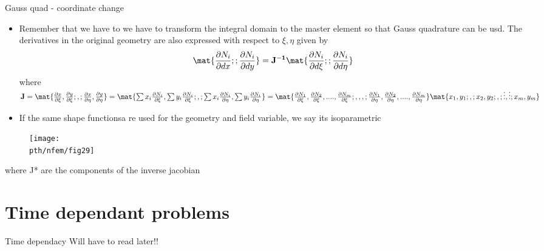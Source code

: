 	
	\begin{frame}{Gauss quad - coordinate change}
		\begin{itemize}
			\item Remember that we have to we have to transform the integral domain to the master element so that Gauss quadrature can be usd. The derivatives in the original geometry are also expressed with respect to $\xi,\eta$ given by
			\begin{equation}
			\mat{\frac{\partial N_i}{\partial dx}; ;\frac{\partial N_i}{\partial dy} } = \ve{J^{-1}} \mat{\frac{\partial N_i}{\partial d\xi}; ;\frac{\partial N_i}{\partial d\eta} } 
			\end{equation}
			where $\ve{J} = \mat{\frac{\partial x}{\partial \xi}, \frac{\partial y}{\partial \xi}; , ; \frac{\partial x}{\partial \eta}, \frac{\partial y}{\partial \eta}} =
			\mat {\sum x_i \frac{\partial N_i}{\partial \xi}, \sum y_i \frac{\partial N_i}{\partial \xi} ; , ; 
			\sum x_i \frac{\partial N_i}{\partial \eta}, \sum y_i \frac{\partial N_i}{\partial \eta}} = \mat{\frac{\partial N_1}{\partial \xi}, \frac{\partial N_2}{\partial \xi}, .... ,\frac{\partial N_m}{\partial \xi} ; , , ,;
			\frac{\partial N_1}{\partial \eta}, \frac{\partial N_2}{\partial \eta}, ...., \frac{\partial N_m}{\partial \eta} }
	 		\mat{x_1, y_1; , ; x_2, y_2; , ; \vdots, \vdots; x_m,y_m}$ 
	 		\item If the same shape functionsa re used for the geometry and field variable, we say its isoparametric
		\end{itemize}
	\end{frame}


	\begin{frame}
		\begin{figure}
			\centering
			\texttt{[image: \\pth/nfem/fig29]} 		
		\end{figure} 
	where J* are the components of the inverse jacobian
	\end{frame}


	\section{Time dependant problems}
	
	\begin{frame}{Time dependacy}
		Will have to read later!!
	\end{frame}
